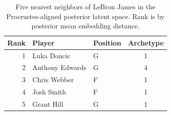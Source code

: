 \begin{table}[htbp]
  \centering\small
  \begin{tabular}{rllc}
    \toprule
    Rank & Player & Position & Archetype \\
    \midrule
    1 & Luka Doncic & G & 1 \\
    2 & Anthony Edwards & G & 4 \\
    3 & Chris Webber & F & 1 \\
    4 & Josh Smith & F & 1 \\
    5 & Grant Hill & G & 1 \\
    \bottomrule
  \end{tabular}
  \caption{Five nearest neighbors of LeBron James in the Procrustes-aligned posterior latent space. Rank is by posterior mean embedding distance.}
  \label{tab:LeBron_James_neighbors}
\end{table}

